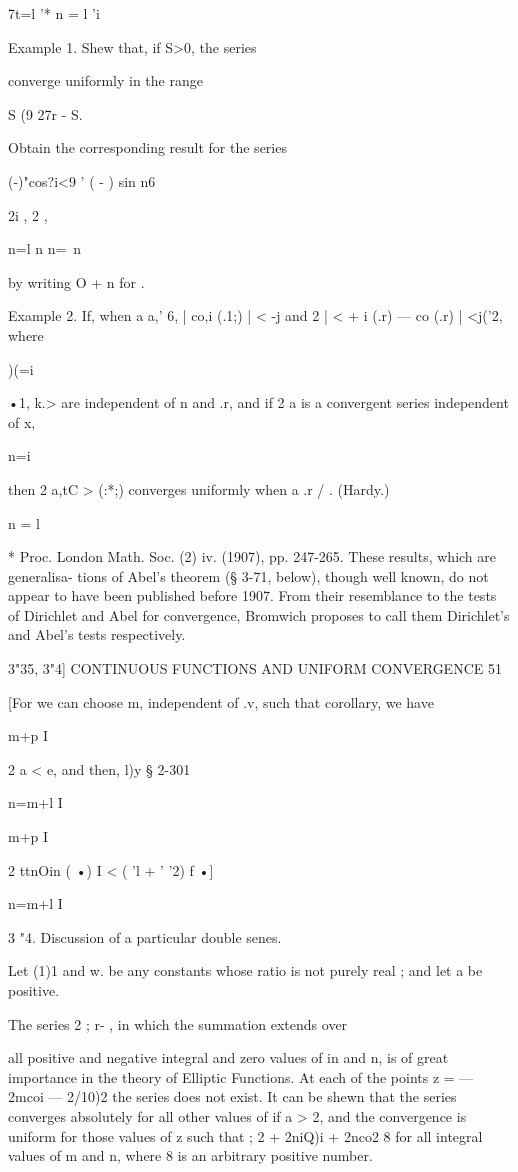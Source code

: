 7t=l '* n = l 'i



Example 1. Shew that, if S>0, the series

converge uniformly in the range

S (9 27r - S.

Obtain the corresponding result for the series

  (-)"cos?i<9 ' ( - ) sin n6

2i , 2 ,

n=l n n=\ n

by writing O + n for .

Example 2. If, when a a,' 6, | co,i (.1;) | < -j and 2 | < + i (.r) —
co (.r) | <j('2, where

)(=i

 •1, k.> are independent of n and .r, and if 2 a is a convergent
series independent of x,

n=i

then 2 a,tC > (:*;) converges uniformly when a .r / . (Hardy.)

n = l

* Proc. London Math. Soc. (2) iv. (1907), pp. 247-265. These results,
which are generalisa- tions of Abel's theorem (§ 3-71, below), though
well known, do not appear to have been published before 1907. From
their resemblance to the tests of Dirichlet and Abel for convergence,
Bromwich proposes to call them Dirichlet's and Abel's tests
respectively.



3"35, 3"4] CONTINUOUS FUNCTIONS AND UNIFORM CONVERGENCE 51

[For we can choose m, independent of .v, such that corollary, we have



m+p I

2 a < e, and then, l)y § 2-301

n=m+l I



m+p I

2 ttnOin ( •) I < ( 'l + ' '2) f •]



n=m+l I

3 "4. Discussion of a particular double senes.

Let (1)1 and w. be any constants whose ratio is not purely real ; and
let a be positive.

The series 2 ; r- , in which the summation extends over

all positive and negative integral and zero values of in and n, is of
great importance in the theory of Elliptic Functions. At each of the
points z = — 2mcoi — 2/10)2 the series does not exist. It can be shewn
that the series converges absolutely for all other values of if a > 2,
and the convergence is uniform for those values of z such that ; 2 +
2niQ)i + 2nco2 8 for all integral values of m and n, where 8 is an
arbitrary positive number.

